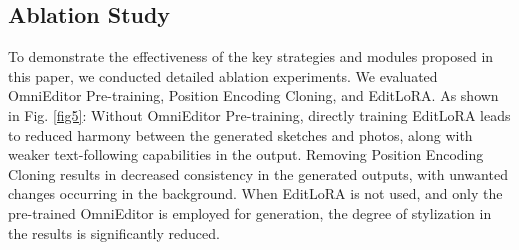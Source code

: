 




\subsection{Ablation Study}

To demonstrate the effectiveness of the key strategies and modules proposed in this paper, we conducted detailed ablation experiments. We evaluated OmniEditor Pre-training, Position Encoding Cloning, and EditLoRA. As shown in Fig. \ref{fig5}:  Without OmniEditor Pre-training, directly training EditLoRA leads to reduced harmony between the generated sketches and photos, along with weaker text-following capabilities in the output.  Removing Position Encoding Cloning results in decreased consistency in the generated outputs, with unwanted changes occurring in the background.  When EditLoRA is not used, and only the pre-trained OmniEditor is employed for generation, the degree of stylization in the results is significantly reduced.  



